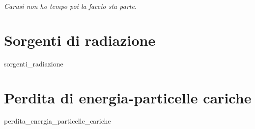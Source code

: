 \documentclass[openany,12pt]{book}
\begin{document}
\textit{Carusi non ho tempo poi la faccio sta parte.}

\chapter{Sorgenti di radiazione}
{sorgenti_radiazione}

\chapter{Perdita di energia-particelle cariche}
{perdita_energia_particelle_cariche}
\end{document}
